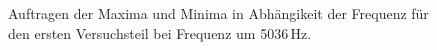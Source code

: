 \documentclass[11pt,a4paper]{article}
\begin{document}
\begin{figure}[p]
\centering
{}
\renewcommand\thefigure{6}
\caption[Auftragen der Maxima und Minima in Abh\"angikeit der Frequenz f\"ur den ersten Versuchsteil bei Frequenz um 5036 Hz]{Auftragen der Maxima und Minima in Abh\"angikeit der Frequenz f\"ur den ersten Versuchsteil bei Frequenz um 5036\,Hz.}
\label{Abb:6}
\end{figure}
\end{document}
